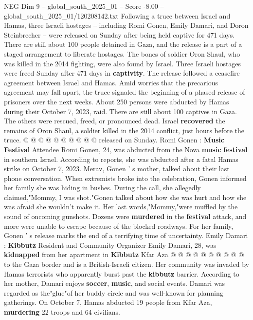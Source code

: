 \begin{textsample}{NEG Dim 9 – global\_south\_2025\_01 – Score -8.00 – global\_south\_2025\_01/120208142.txt}  \label{ex:f9_neg_134}
Following a truce between Israel and Hamas, three Israeli hostages -- including Romi Gonen, Emily Damari, and Doron Steinbrecher -- were released on Sunday after being held captive for 471 days.
There are still about 100 people detained in Gaza, and the release is a part of a staged arrangement to liberate hostages.
The bones of soldier Oron Shaul, who was killed in the 2014 fighting, were also found by Israel.
Three Israeli hostages were freed Sunday after 471 days in \textbf{captivity}.
The release followed a ceasefire agreement between Israel and Hamas.
Amid worries that the precarious agreement may fall apart, the truce signaled the beginning of a phased release of prisoners over the next weeks.
About 250 persons were abducted by Hamas during their October 7, 2023, raid.
There are still about 100 captives in Gaza.
The others were rescued, freed, or pronounced dead.
Israel \textbf{recovered} the remains of Oron Shaul, a soldier killed in the 2014 conflict, just hours before the truce. @ @ @ @ @ @ @ @ @ @ released on Sunday.
Romi Gonen : \textbf{Music} \textbf{Festival} Attendee Romi Gonen, 24, was abducted from the Nova \textbf{music} \textbf{festival} in southern Israel.
According to reports, she was abducted after a fatal Hamas strike on October 7, 2023.
Merav, Gonen ' s mother, talked about their last phone conversation.
When extremists broke into the celebration, Gonen informed her family she was hiding in bushes.
During the call, she allegedly claimed,"Mommy, I was shot."Gonen talked about how she was hurt and how she was afraid she wouldn't make it.
Her last words,"Mommy,"were muffled by the sound of oncoming gunshots.
Dozens were \textbf{murdered} in the \textbf{festival} attack, and more were unable to escape because of the blocked roadways.
For her family, Gonen ' s release marks the end of a terrifying time of uncertainty.
Emily Damari : \textbf{Kibbutz} Resident and Community Organizer Emily Damari, 28, was \textbf{kidnapped} from her apartment in \textbf{Kibbutz} Kfar Aza @ @ @ @ @ @ @ @ @ @ to the Gaza border and is a British-Israeli citizen.
Her community was invaded by Hamas terrorists who apparently burst past the \textbf{kibbutz} barrier.
According to her mother, Damari enjoys \textbf{soccer}, \textbf{music}, and social events.
Damari was regarded as the"glue"of her buddy circle and was well-known for planning gatherings.
On October 7, Hamas abducted 19 people from Kfar Aza, \textbf{murdering} 22 troops and 64 civilians.

\end{textsample}
